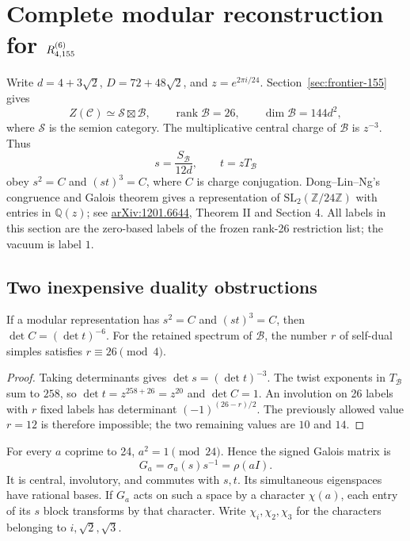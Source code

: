 \section{Complete modular reconstruction for \texorpdfstring{$R^{(6)}_{4,155}$}{R6\_4\_155}}\label{sec:155-complete-modular}

Write $d=4+3\sqrt2$, $D=72+48\sqrt2$, and $z=e^{2\pi i/24}$.
Section~\ref{sec:frontier-155} gives
\[
 Z(\mathcal C)\simeq\mathcal S\boxtimes\mathcal B,
 \qquad \operatorname{rank}\mathcal B=26,\qquad
 \dim\mathcal B=144d^2,
\]
where $\mathcal S$ is the semion category. The multiplicative central
charge of $\mathcal B$ is $z^{-3}$. Thus
\[
 s=\frac{S_{\mathcal B}}{12d},\qquad t=zT_{\mathcal B}
\]
obey $s^2=C$ and $(st)^3=C$, where $C$ is charge conjugation.
Dong--Lin--Ng's congruence and Galois theorem gives a representation of
$\mathrm{SL}_2(\mathbb Z/24\mathbb Z)$ with entries in
$\mathbb Q(z)$; see \href{https://arxiv.org/abs/1201.6644}{arXiv:1201.6644},
Theorem II and Section 4. All labels in this section are the zero-based
labels of the frozen rank-26 restriction list; the vacuum is label $1$.

\subsection{Two inexpensive duality obstructions}

\begin{lemma}
If a modular representation has $s^2=C$ and $(st)^3=C$, then
$\det C=(\det t)^{-6}$.
For the retained spectrum of $\mathcal B$, the number $r$ of self-dual
simples satisfies $r\equiv26\pmod4$.
\end{lemma}
\begin{proof}
Taking determinants gives $\det s=(\det t)^{-3}$.
The twist exponents in $T_{\mathcal B}$ sum to $258$, so
$\det t=z^{258+26}=z^{20}$ and $\det C=1$.
An involution on 26 labels with $r$ fixed labels has determinant
$(-1)^{(26-r)/2}$. The previously allowed value $r=12$ is therefore
impossible; the two remaining values are $10$ and $14$.
\end{proof}

For every $a$ coprime to 24, $a^2=1\pmod{24}$. Hence the signed Galois
matrix is
\[
 G_a=\sigma_a(s)s^{-1}=\rho(aI).
\]
It is central, involutory, and commutes with $s,t$. Its simultaneous
eigenspaces have rational bases. If $G_a$ acts on such a space by a
character $\chi(a)$, each entry of its $s$ block transforms by that
character. Write $\chi_i,\chi_2,\chi_3$ for the characters belonging
to $i,\sqrt2,\sqrt3$.

